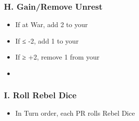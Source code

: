 \documentclass[10pt]{article}
\begin{document}
\subsubsection*{H. Gain/Remove Unrest}
\begin{itemize}
	\item If at War, add 2 \unrest to your \towns
	\item If ≤ -2\stability, add 1 \unrest to your \towns
	\item If ≥ +2\stability, remove 1 \unrest from your \towns
	\item {}
\end{itemize}

\subsubsection*{I. Roll Rebel Dice}
\begin{itemize}
	\item In Turn order, each PR rolls Rebel Dice
\end{itemize}
\end{document}

